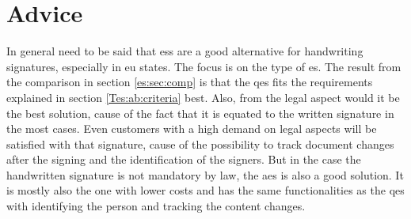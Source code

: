 \section{Advice}
In general need to be said that \glspl{es} are a good alternative for handwriting signatures, especially in \gls{eu} states. The focus is on the type of \gls{es}. The result from the comparison in section \ref{es:sec:comp} is that the \gls{qes} fits the requirements explained in section \ref{Tes:ab:criteria} best. Also, from the legal aspect would it be the best solution, cause of the fact that it is equated to the written signature in the most cases. Even customers with a high demand on legal aspects will be satisfied with that signature, cause of the possibility to track document changes after the signing and the identification of the signers. But in the case the handwritten signature is not mandatory by law, the \gls{aes} is also a good solution. It is mostly also the one with lower costs and has the same functionalities as the \gls{qes} with identifying the person and tracking the content changes.